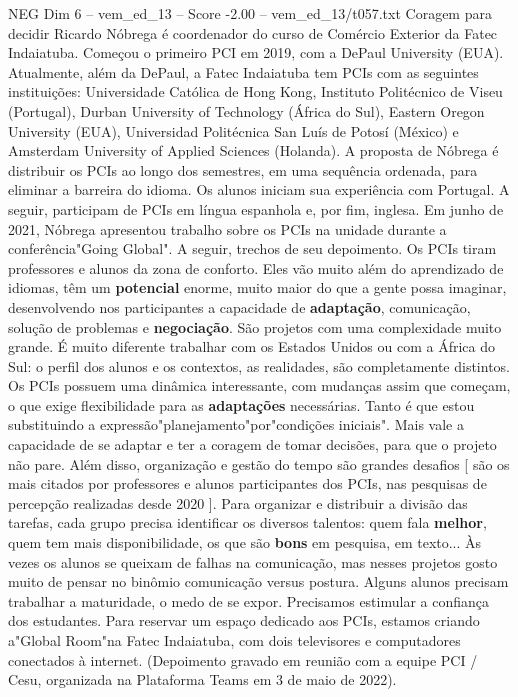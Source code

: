 \begin{textsample}{NEG Dim 6 – vem\_ed\_13 – Score -2.00 – vem\_ed\_13/t057.txt}  \label{ex:f6_neg_043}
Coragem para decidir Ricardo Nóbrega é coordenador do curso de Comércio Exterior da Fatec Indaiatuba.
Começou o primeiro PCI em 2019, com a DePaul University (EUA).
Atualmente, além da DePaul, a Fatec Indaiatuba tem PCIs com as seguintes instituições: Universidade Católica de Hong Kong, Instituto Politécnico de Viseu (Portugal), Durban University of Technology (África do Sul), Eastern Oregon University (EUA), Universidad Politécnica San Luís de Potosí (México) e Amsterdam University of Applied Sciences (Holanda).
A proposta de Nóbrega é distribuir os PCIs ao longo dos semestres, em uma sequência ordenada, para eliminar a barreira do idioma.
Os alunos iniciam sua experiência com Portugal.
A seguir, participam de PCIs em língua espanhola e, por fim, inglesa.
Em junho de 2021, Nóbrega apresentou trabalho sobre os PCIs na unidade durante a conferência"Going Global".
A seguir, trechos de seu depoimento.
Os PCIs tiram professores e alunos da zona de conforto.
Eles vão muito além do aprendizado de idiomas, têm um \textbf{potencial} enorme, muito maior do que a gente possa imaginar, desenvolvendo nos participantes a capacidade de \textbf{adaptação}, comunicação, solução de problemas e \textbf{negociação}.
São projetos com uma complexidade muito grande.
É muito diferente trabalhar com os Estados Unidos ou com a África do Sul: o perfil dos alunos e os contextos, as realidades, são completamente distintos.
Os PCIs possuem uma dinâmica interessante, com mudanças assim que começam, o que exige flexibilidade para as \textbf{adaptações} necessárias.
Tanto é que estou substituindo a expressão"planejamento"por"condições iniciais".
Mais vale a capacidade de se adaptar e ter a coragem de tomar decisões, para que o projeto não pare.
Além disso, organização e gestão do tempo são grandes desafios [ são os mais citados por professores e alunos participantes dos PCIs, nas pesquisas de percepção realizadas desde 2020 ].
Para organizar e distribuir a divisão das tarefas, cada grupo precisa identificar os diversos talentos: quem fala \textbf{melhor}, quem tem mais disponibilidade, os que são \textbf{bons} em pesquisa, em texto... Às vezes os alunos se queixam de falhas na comunicação, mas nesses projetos gosto muito de pensar no binômio comunicação versus postura.
Alguns alunos precisam trabalhar a maturidade, o medo de se expor.
Precisamos estimular a confiança dos estudantes.
Para reservar um espaço dedicado aos PCIs, estamos criando a"Global Room"na Fatec Indaiatuba, com dois televisores e computadores conectados à internet. (Depoimento gravado em reunião com a equipe PCI / Cesu, organizada na Plataforma Teams em 3 de maio de 2022).

\end{textsample}
